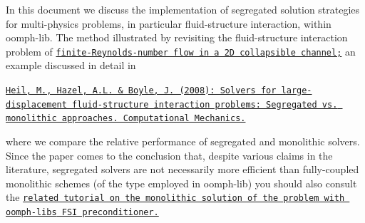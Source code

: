 In this document we discuss the implementation of segregated solution strategies for multi-\/physics problems, in particular fluid-\/structure interaction, within {\ttfamily oomph-\/lib}. The method illustrated by revisiting the fluid-\/structure interaction problem of \href{../../fsi_collapsible_channel/html/index.html}{\tt finite-\/\+Reynolds-\/number flow in a 2D collapsible channel;} an example discussed in detail in \begin{center} \href{http://www.springerlink.com/content/m3r6318701g338g4/}{\tt Heil, M., Hazel, A.\+L. \& Boyle, J. (2008)\+: Solvers for large-\/displacement fluid-\/structure interaction problems\+: Segregated vs. monolithic approaches. Computational Mechanics.} \end{center} 

where we compare the relative performance of segregated and monolithic solvers. Since the paper comes to the conclusion that, despite various claims in the literature, segregated solvers are not necessarily more efficient than fully-\/coupled monolithic schemes (of the type employed in {\ttfamily oomph-\/lib}) you should also consult the \href{../../../preconditioners/fsi/html/index.html}{\tt related tutorial on the monolithic solution of the problem with {\ttfamily oomph-\/lib\textquotesingle{}s} F\+SI preconditioner.}



 

